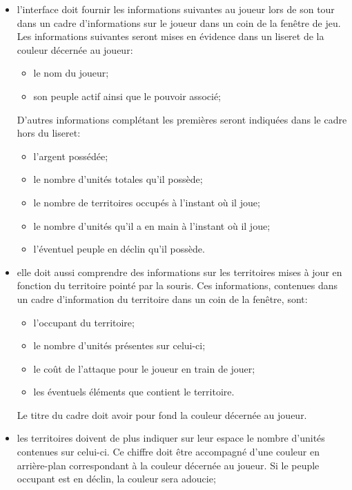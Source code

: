 \documentclass[a4paper, 11pt]{article}
\begin{document}
			\begin{itemize}
				\item l'interface doit fournir les informations suivantes au joueur lors de son tour dans un cadre d'informations sur le joueur dans un coin de la fenêtre de jeu. Les informations suivantes seront mises en évidence dans un liseret de la couleur décernée au joueur:
				\begin{itemize}
					\item le nom du joueur;
					\item son peuple actif ainsi que le pouvoir associé;
				\end{itemize}
				D'autres informations complétant les premières seront indiquées dans le cadre hors du liseret:
				\begin{itemize}
					\item l'argent possédée;
					\item le nombre d'unités totales qu'il possède;
					\item le nombre de territoires occupés à l'instant où il joue;
					\item le nombre d'unités qu'il a en main à l'instant où il joue;
					\item l'éventuel peuple en déclin qu'il possède. \\
				\end{itemize}
				
				\item elle doit aussi comprendre des informations sur les territoires mises à jour en fonction du territoire pointé par la souris. Ces informations, contenues dans un cadre d'information du territoire dans un coin de la fenêtre, sont:
				\begin{itemize}
					\item l'occupant du territoire;
					\item le nombre d'unités présentes sur celui-ci;
					\item le coût de l'attaque pour le joueur en train de jouer;
					\item les éventuels éléments que contient le territoire.
				\end{itemize}
				Le titre du cadre doit avoir pour fond la couleur décernée au joueur.
				\item les territoires doivent de plus indiquer sur leur espace le nombre d'unités contenues sur celui-ci. Ce chiffre doit être accompagné d'une couleur en arrière-plan correspondant à la couleur décernée au joueur. Si le peuple occupant est en déclin, la couleur sera adoucie; \\
				

\end{itemize}
\end{document}
